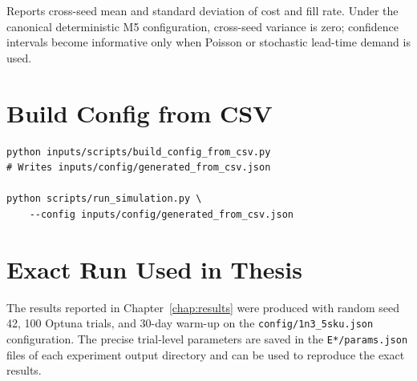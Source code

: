 Reports cross-seed mean and standard deviation of cost and fill rate.
Under the canonical deterministic M5 configuration, cross-seed variance
is zero; confidence intervals become informative only when Poisson or
stochastic lead-time demand is used.

\section*{Build Config from CSV}

\begin{verbatim}
python inputs/scripts/build_config_from_csv.py
# Writes inputs/config/generated_from_csv.json

python scripts/run_simulation.py \
    --config inputs/config/generated_from_csv.json
\end{verbatim}

\section*{Exact Run Used in Thesis}

The results reported in Chapter~\ref{chap:results} were produced with
random seed 42, 100 Optuna trials, and 30-day warm-up on the
\texttt{config/1n3\_5sku.json} configuration.  The precise trial-level
parameters are saved in the \texttt{E*/params.json} files of each
experiment output directory and can be used to reproduce the exact
results.
